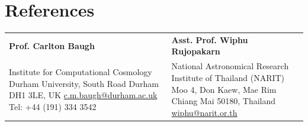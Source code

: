 \documentclass[a4paper,10pt]{article}
\begin{document}
\section{References}
\begin{tabularx}{\linewidth}{@{}XX@{}}
  \textbf{Prof. Carlton Baugh} & \textbf{Asst. Prof. Wiphu Rujopakarn} \\
  {\footnotesize\color{muted}
    Institute for Computational Cosmology\newline
    Durham University, South Road\newline
    Durham DH1 3LE, UK\newline
    \href{mailto:c.m.baugh@durham.ac.uk}{c.m.baugh@durham.ac.uk}\newline
    Tel: +44 (191) 334 3542
  } &
  {\footnotesize\color{muted}
    National Astronomical Research\newline
    Institute of Thailand (NARIT)\newline
    260 Moo 4, Don Kaew, Mae Rim\newline
    Chiang Mai 50180, Thailand\newline
    \href{mailto:wiphu@narit.or.th}{wiphu@narit.or.th}
  } \\
\end{tabularx}
\end{document}
